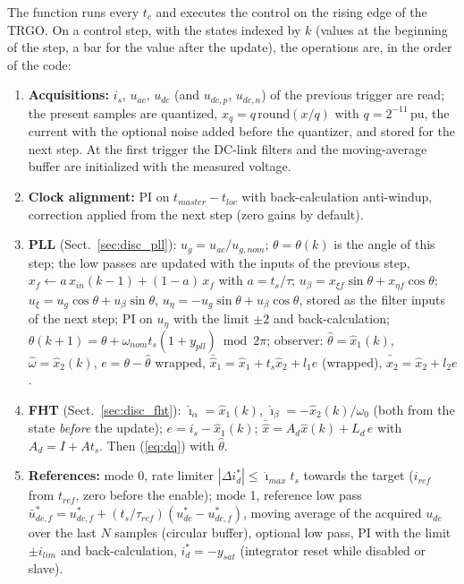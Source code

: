 \documentclass[10pt,a4paper]{scrartcl}
\newcommand{\ts}{t_s}
\newcommand{\tc}{t_c}
\newcommand{\wo}{\omega_0}
\newcommand{\pu}{\,\mathrm{pu}}
\newcommand{\ihat}{\hat{\imath}}
\begin{document}
\begin{onehalfspace}
The function runs every $\tc$ and executes the control on the rising edge of the TRGO. On a control step, with the states indexed by $k$ (values at the beginning of the step, a bar for the value after the update), the operations are, in the order of the code:
\begin{enumerate}
\item \textbf{Acquisitions:} $i_s$, $u_{ac}$, $u_{dc}$ (and $u_{dc,p}$, $u_{dc,n}$) of the previous trigger are read; the present samples are quantized, $x_q = q\,\mathrm{round}(x/q)$ with $q = 2^{-11}\pu$, the current with the optional noise added before the quantizer, and stored for the next step. At the first trigger the DC-link filters and the moving-average buffer are initialized with the measured voltage.
\item \textbf{Clock alignment:} PI on $t_{master} - t_{loc}$ with back-calculation anti-windup, correction applied from the next step (zero gains by default).
\item \textbf{PLL} (Sect.~\ref{sec:disc_pll}): $u_g = u_{ac}/u_{g,nom}$; $\theta = \theta(k)$ is the angle of this step; the low passes are updated with the inputs of the previous step, $x_f \leftarrow a\,x_{in}(k-1) + (1 - a)\,x_f$ with $a = \ts/\tau$; $u_\beta = x_{\xi f}\sin\theta + x_{\eta f}\cos\theta$; $u_\xi = u_g\cos\theta + u_\beta\sin\theta$, $u_\eta = -u_g\sin\theta + u_\beta\cos\theta$, stored as the filter inputs of the next step; PI on $u_\eta$ with the limit $\pm 2$ and back-calculation; $\theta(k+1) = \theta + \omega_{nom}\ts(1 + y_{pll}) \bmod 2\pi$; observer: $\hat\theta = \hat x_1(k)$, $\hat\omega = \hat x_2(k)$, $e = \theta - \hat\theta$ wrapped, $\bar{\hat x}_1 = \hat x_1 + \ts\hat x_2 + l_1 e$ (wrapped), $\bar{\hat x}_2 = \hat x_2 + l_2 e$.
\item \textbf{FHT} (Sect.~\ref{sec:disc_fht}): $\ihat_\alpha = \hat x_1(k)$, $\ihat_\beta = -\hat x_2(k)/\wo$ (both from the state \emph{before} the update); $e = i_s - \hat x_1(k)$; $\bar{\hat x} = A_d\hat x(k) + L_d\,e$ with $A_d = I + A\ts$. Then (\ref{eq:dq}) with $\hat\theta$.
\item \textbf{References:} mode 0, rate limiter $|\Delta i_d^*| \le \dot\imath_{max}\ts$ towards the target ($i_{ref}$ from $t_{ref}$, zero before the enable); mode 1, reference low pass $\bar u^*_{dc,f} = u^*_{dc,f} + (\ts/\tau_{ref})(u_{dc}^* - u^*_{dc,f})$, moving average of the acquired $u_{dc}$ over the last $N$ samples (circular buffer), optional low pass, PI with the limit $\pm i_{lim}$ and back-calculation, $i_d^* = -y_{sat}$ (integrator reset while disabled or slave).

\end{enumerate}
\end{onehalfspace}
\end{document}
